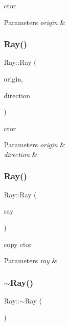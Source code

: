 c\textquotesingle{}tor 
\begin{DoxyParams}{Parameters}
{\em origin} & \\
\hline
\end{DoxyParams}
\mbox{\label{struct_ray_a46a83135920eb622d6c51cc15091c6fc}} 
\subsubsection{\texorpdfstring{Ray()}{Ray()}\hspace{0.1cm}{\footnotesize\ttfamily [3/4]}}
{\footnotesize\ttfamily Ray\+::\+Ray (\begin{DoxyParamCaption}\item[{const Q\+Vector3D \&}]{origin,  }\item[{const Q\+Vector3D \&}]{direction }\end{DoxyParamCaption})}

c\textquotesingle{}tor 
\begin{DoxyParams}{Parameters}
{\em origin} & \\
\hline
{\em direction} & \\
\hline
\end{DoxyParams}
\mbox{\label{struct_ray_a155a0b6573cf6a9a2256eb5062523daf}} 
\subsubsection{\texorpdfstring{Ray()}{Ray()}\hspace{0.1cm}{\footnotesize\ttfamily [4/4]}}
{\footnotesize\ttfamily Ray\+::\+Ray (\begin{DoxyParamCaption}\item[{const \mbox{\hyperlink{struct_ray}{Ray}} \&}]{ray }\end{DoxyParamCaption})}

copy c\textquotesingle{}tor 
\begin{DoxyParams}{Parameters}
{\em ray} & \\
\hline
\end{DoxyParams}
\mbox{\label{struct_ray_a8b0e575ce5df046c0c7615c32a96a46f}} 
\subsubsection{\texorpdfstring{$\sim$\+Ray()}{~Ray()}}
{\footnotesize\ttfamily Ray\+::$\sim$\+Ray (\begin{DoxyParamCaption}{ }\end{DoxyParamCaption})}

